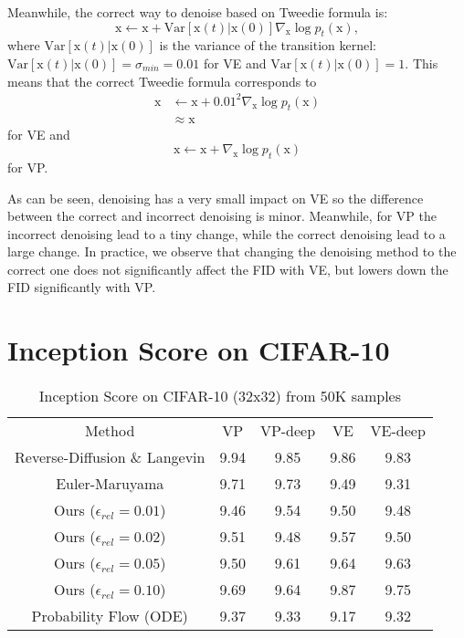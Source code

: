 \documentclass{article}
\newcommand{\x}{\boldsymbol{\mathrm{x}}}
\begin{document}
Meanwhile, the correct way to denoise based on Tweedie formula \citep{efron2011tweedie} is:
\begin{equation*}
 \x \gets \x + \text{Var}[\x(t)|\x(0)] \nabla_{\x} \log p_t(\x),
\end{equation*}
where $\text{Var}[\x(t)|\x(0)]$ is the variance of the transition kernel: $\text{Var}[\x(t)|\x(0)] = \sigma_{min}=0.01$ for VE and $\text{Var}[\x(t)|\x(0)] = 1$.
This means that the correct Tweedie formula corresponds to
\begin{align*} \x &\gets \x + 0.01^2 \nabla_{\x} \log p_t(\x) \\
&\approx \x
\end{align*} for VE and $$\x \gets \x + \nabla_{\x} \log p_t(\x)$$ for VP.

As can be seen, denoising has a very small impact on VE so the difference between the correct and incorrect denoising is minor. Meanwhile, for VP the incorrect denoising lead to a tiny change, while the correct denoising lead to a large change. In practice, we observe that changing the denoising method to the correct one does not significantly affect the FID with VE, but lowers down the FID significantly with VP.

\clearpage









\section{Inception Score on CIFAR-10}\label{sec:inception}

\begin{table}[!htbp]
	\caption{Inception Score on CIFAR-10 (32x32) from 50K samples}
	\label{tab:table3}
	\centering
	\begin{tabular}{ccccc}
		\toprule
		Method & VP & VP-deep & VE & VE-deep \\
		\cmidrule(){1-5}
		Reverse-Diffusion \& Langevin  & 9.94 & 9.85 &  9.86 &  9.83 \\
		\cmidrule(){1-5}
		Euler-Maruyama & 9.71 & 9.73 & 9.49 & 9.31 \\
		Ours ($\epsilon_{rel}=0.01$) & 9.46 & 9.54 & 9.50 & 9.48 \\
		Ours ($\epsilon_{rel}=0.02$) & 9.51 & 9.48 & 9.57 & 9.50 \\
		Ours ($\epsilon_{rel}=0.05$) & 9.50 & 9.61 & 9.64 & 9.63 \\
		Ours ($\epsilon_{rel}=0.10$) & 9.69 & 9.64 & 9.87 & 9.75 \\
		Probability Flow (ODE) & 9.37 & 9.33 & 9.17 & 9.32 \\
		\bottomrule
	\end{tabular}
\end{table}
\end{document}
